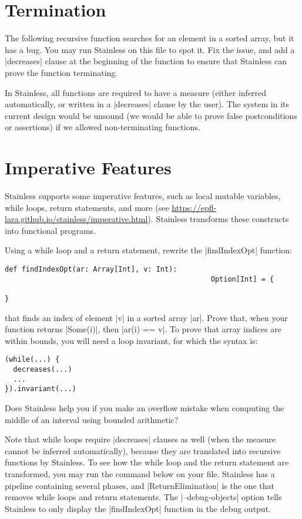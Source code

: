 \section{Termination}

The following recursive function searches for an element in a sorted array, but
it has a bug. You may run Stainless on this file to spot it. Fix the issue, and
add a |decreases| clause at the beginning of the function to ensure that Stainless
can prove the function terminating.



In Stainless, all functions are required to have a measure (either inferred
automatically, or written in a |decreases| clause by the user). The system in
its current design would be unsound (we would be able to prove false postconditions
or assertions) if we allowed non-terminating functions.


\section{Imperative Features}

Stainless supports some imperative features, such as local mutable variables,
while loops, return statements, and more (see \url{https://epfl-lara.github.io/stainless/imperative.html}).
Stainless transforms these constructs into functional programs.

Using a while loop and a return statement, rewrite the |findIndexOpt| function:
\begin{lstlisting}
def findIndexOpt(ar: Array[Int], v: Int):
                                                 Option[Int] = {

}
\end{lstlisting}
that finds an index of element |v|
in a sorted array |ar|. Prove that, when your
function returns |Some(i)|,
then |ar(i) == v|. To prove that array indices are within bounds, you will need a
loop invariant, for which the syntax is:

\begin{lstlisting}
(while(...) {
  decreases(...)
  ...
}).invariant(...)
\end{lstlisting}
Does Stainless help you if you make an overflow mistake when computing
the middle of an interval using bounded arithmetic?

Note that while loops require |decreases| clauses as well (when the measure
cannot be inferred automatically), because they are translated into recursive
functions by Stainless.
To see how the while loop and the return statement are transformed,
you may run the command below on your file. Stainless
has a pipeline containing several phases, and |ReturnElimination| is the one
that removes while loops and return statements. The |--debug-objects| option tells
Stainless to only display the |findIndexOpt| function in the debug output.

